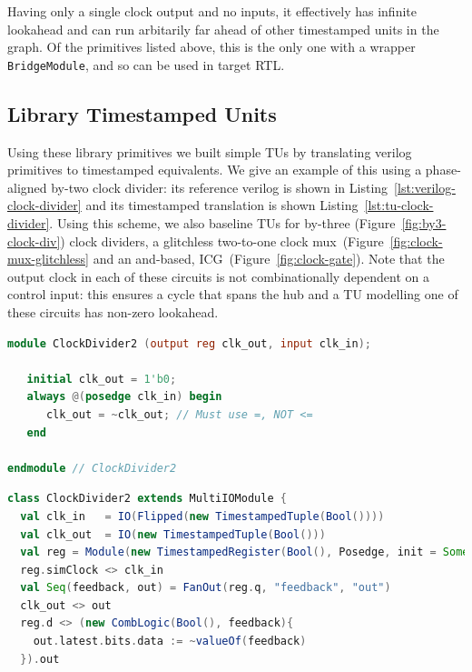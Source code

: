 Having only a single clock output and no inputs, it effectively has infinite
lookahead and can run arbitarily far ahead of other timestamped units in the
graph.  Of the primitives listed above, this is the only one with a wrapper
\texttt{BridgeModule}, and so can be used in target RTL.

\subsection{Library Timestamped Units}
Using these library primitives we built simple TUs by translating verilog
primitives to timestamped equivalents. We give an example of this using a
phase-aligned by-two clock divider: its reference verilog is shown in
Listing~\ref{lst:verilog-clock-divider} and its timestamped translation is
shown Listing~\ref{lst:tu-clock-divider}. Using this scheme, we also baseline
TUs for by-three (Figure~\ref{fig:by3-clock-div}) clock dividers, a glitchless
two-to-one clock mux~(Figure~\ref{fig:clock-mux-glitchless} and an and-based,
ICG~(Figure~\ref{fig:clock-gate}).  Note that the output clock in each of these
circuits is not combinationally dependent on a control input: this ensures a
cycle that spans the hub and a TU modelling one of these circuits has non-zero
lookahead.

\begin{lstlisting}[language=Verilog, style=verilogStyle, float,
label={lst:verilog-clock-divider}, caption=A reference phase-aligned clock-divider from Rocket Chip used in RTL simulation.]
module ClockDivider2 (output reg clk_out, input clk_in);

   initial clk_out = 1'b0;
   always @(posedge clk_in) begin
      clk_out = ~clk_out; // Must use =, NOT <=
   end

endmodule // ClockDivider2
\end{lstlisting}

\begin{lstlisting}[language=Scala, style=scalaStyle, float, label={lst:tu-clock-divider}, caption=The equivalent timestamped unit for the clock divider shown in Listing~\ref{lst:verilog-clock-divider} implemented using library primitives.]
class ClockDivider2 extends MultiIOModule {
  val clk_in   = IO(Flipped(new TimestampedTuple(Bool())))
  val clk_out  = IO(new TimestampedTuple(Bool()))
  val reg = Module(new TimestampedRegister(Bool(), Posedge, init = Some(false.B)))
  reg.simClock <> clk_in
  val Seq(feedback, out) = FanOut(reg.q, "feedback", "out")
  clk_out <> out
  reg.d <> (new CombLogic(Bool(), feedback){
    out.latest.bits.data := ~valueOf(feedback)
  }).out
\end{lstlisting}


